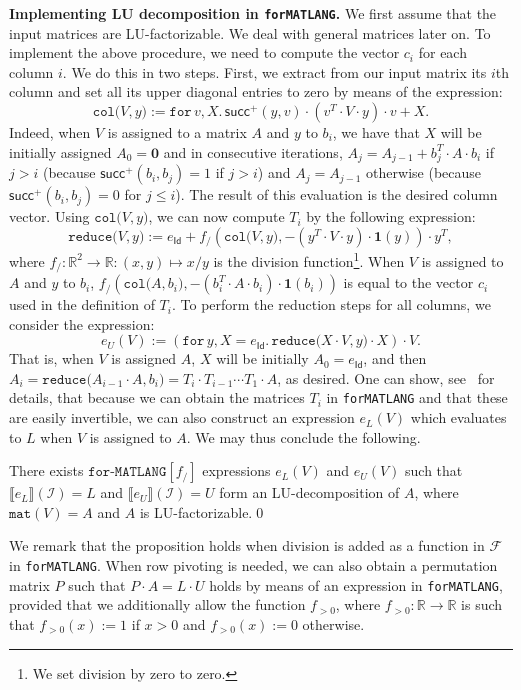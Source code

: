 \documentclass[sigconf]{acmart}
\newcommand{\RR}{\mathbb{R}}
\newcommand{\sem}[2]{\llbracket #1 \rrbracket(#2)}
\newcommand{\Fun}{\mathcal{F}}
\newcommand{\ones}{\mathbf{1}}
\newcommand{\I}{\mathcal{I}}
\newcommand{\conc}{\texttt{mat}}
\newcommand{\langfor}{\texttt{for}\text{-}\texttt{MATLANG}\xspace}
\newcommand{\langforf}[1]{\texttt{for}\text{-}\texttt{MATLANG}[#1]\xspace}
\newcommand{\ffor}[3]{\texttt{for}\, #1,#2 \texttt{.}\, #3}
\newcommand{\initf}[4]{\texttt{for}\, #2,#3\!=\! #1 \texttt{.}\, #4}
\newcommand{\ccol}[2]{\texttt{col(}#1,#2\texttt{)}}
\newcommand{\red}[2]{\texttt{reduce(}#1,#2\texttt{)}}
\begin{document}
\smallskip
\noindent
\textbf{Implementing LU decomposition in \langfor.} 
We first assume that the input matrices are LU-factorizable. We deal with general matrices later on.
To implement the above procedure, we need to compute the vector $c_i$ for each column $i$. We do this in two steps. First, we extract from our input matrix its $i$th column and set all its upper diagonal entries to zero
by means of 
 the 
 expression:
$$\ccol{V}{y} := \ffor{v}{X}{\mathsf{succ}^+(y,v)\cdot(v^T\cdot V \cdot y)\cdot v + X}.$$
Indeed, when $V$ is assigned to a matrix $A$ and $y$ to $b_i$, we have that $X$ will be initially assigned
$A_0=\mathbf{0}$ and in consecutive iterations,  $A_j=A_{j-1}+ b_j^T\cdot A\cdot b_i$ if $j>i$ (because $\mathsf{succ}^+(b_i,b_j)=1$ if $j>i$) and $A_j=A_{j-1}$ otherwise (because $\mathsf{succ}^+(b_i,b_j)=0$ for $j\leq i$). The result of this evaluation is the desired column vector.
Using $\ccol{V}{y}$, we can now compute $T_i$ by the following expression:
$$\red{V}{y} := e_{\mathsf{Id}}+ f_/(\ccol{V}{y},-(y^T\cdot V\cdot y)\cdot \ones(y))\cdot y^T,$$
where $f_/:\RR^2\to\RR:(x,y)\mapsto x/y$ is the division function\footnote{We set division by zero to zero.}. 
When $V$ is assigned to $A$ and $y$ to $b_i$, $f_/(\ccol{A}{b_i},-(b_i^T\cdot A\cdot b_i)\cdot \ones(b_i))$ is equal to the vector $c_i$ used in the definition of $T_i$. To perform the reduction steps for all columns, we consider
the expression:
$$
e_{U}(V) :=  \left( \initf{e_{\mathsf{Id}}}{y}{X}{\red{X\cdot V}{y}\cdot X} \right) \cdot V.
$$
That is, when $V$ is assigned $A$, $X$ will be initially $A_0=e_{\mathsf{Id}}$, and then
$A_i=\red{A_{i-1}\cdot A}{b_i}=T_i\cdot T_{i-1}\cdots T_1\cdot A$, as desired.
One can show, see~\cite{geerts2020expressive} for details, that because we can obtain the matrices $T_i$ in \langfor and that these
are easily invertible, we can also construct an expression $e_L(V)$ which evaluates to $L$ when $V$ is assigned to
$A$. We may thus conclude the following.
\begin{proposition}\label{prop:gauss}
There exists $\langforf{f_/}$ expressions $e_L(V)$ and $e_U(V)$ such that
$\sem{e_L}{\I}=L$ and $\sem{e_U}{\I}=U$ form an LU-decomposition of $A$,
where $\conc(V)=A$ and $A$ is LU-factorizable.\qed
\end{proposition}
We remark that the proposition holds when division is added as a function in $\Fun$
in \langfor. When row pivoting is needed, we can also obtain a permutation matrix
$P$ such that $P\cdot A=L\cdot U$ holds by means of an expression in \langfor, provided
that we additionally allow the function $f_{>0}$, 
where $f_{>0}:\RR\to\RR$ is such that $f_{>0}(x):=1$ if $x>0$ and $f_{>0}(x):=0$ otherwise.
\end{document}

